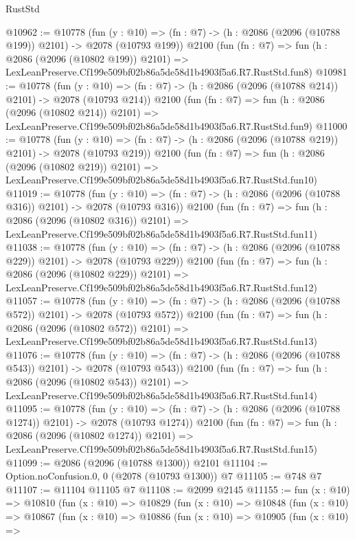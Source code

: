 \begin{lexlean}{RustStd}
\begin{coremodule}
@10962 := @10778
    (fun (y : @10) => (fn : @7) -> (h : @2086 (@2096 (@10788 @199)) @2101) -> @2078 (@10793 @199))
    @2100
    (fun (fn : @7) =>
    fun (h : @2086 (@2096 (@10802 @199)) @2101) =>
    LexLeanPreserve.Cf199e509bf02b86a5de58d1b4903f5a6.R7.RustStd.fun8)
@10981 := @10778
    (fun (y : @10) => (fn : @7) -> (h : @2086 (@2096 (@10788 @214)) @2101) -> @2078 (@10793 @214))
    @2100
    (fun (fn : @7) =>
    fun (h : @2086 (@2096 (@10802 @214)) @2101) =>
    LexLeanPreserve.Cf199e509bf02b86a5de58d1b4903f5a6.R7.RustStd.fun9)
@11000 := @10778
    (fun (y : @10) => (fn : @7) -> (h : @2086 (@2096 (@10788 @219)) @2101) -> @2078 (@10793 @219))
    @2100
    (fun (fn : @7) =>
    fun (h : @2086 (@2096 (@10802 @219)) @2101) =>
    LexLeanPreserve.Cf199e509bf02b86a5de58d1b4903f5a6.R7.RustStd.fun10)
@11019 := @10778
    (fun (y : @10) => (fn : @7) -> (h : @2086 (@2096 (@10788 @316)) @2101) -> @2078 (@10793 @316))
    @2100
    (fun (fn : @7) =>
    fun (h : @2086 (@2096 (@10802 @316)) @2101) =>
    LexLeanPreserve.Cf199e509bf02b86a5de58d1b4903f5a6.R7.RustStd.fun11)
@11038 := @10778
    (fun (y : @10) => (fn : @7) -> (h : @2086 (@2096 (@10788 @229)) @2101) -> @2078 (@10793 @229))
    @2100
    (fun (fn : @7) =>
    fun (h : @2086 (@2096 (@10802 @229)) @2101) =>
    LexLeanPreserve.Cf199e509bf02b86a5de58d1b4903f5a6.R7.RustStd.fun12)
@11057 := @10778
    (fun (y : @10) => (fn : @7) -> (h : @2086 (@2096 (@10788 @572)) @2101) -> @2078 (@10793 @572))
    @2100
    (fun (fn : @7) =>
    fun (h : @2086 (@2096 (@10802 @572)) @2101) =>
    LexLeanPreserve.Cf199e509bf02b86a5de58d1b4903f5a6.R7.RustStd.fun13)
@11076 := @10778
    (fun (y : @10) => (fn : @7) -> (h : @2086 (@2096 (@10788 @543)) @2101) -> @2078 (@10793 @543))
    @2100
    (fun (fn : @7) =>
    fun (h : @2086 (@2096 (@10802 @543)) @2101) =>
    LexLeanPreserve.Cf199e509bf02b86a5de58d1b4903f5a6.R7.RustStd.fun14)
@11095 := @10778
    (fun (y : @10) => (fn : @7) -> (h : @2086 (@2096 (@10788 @1274)) @2101) -> @2078 (@10793 @1274))
    @2100
    (fun (fn : @7) =>
    fun (h : @2086 (@2096 (@10802 @1274)) @2101) =>
    LexLeanPreserve.Cf199e509bf02b86a5de58d1b4903f5a6.R7.RustStd.fun15)
@11099 := @2086 (@2096 (@10788 @1300)) @2101
@11104 := Option.noConfusion.{0, 0} (@2078 (@10793 @1300)) @7
@11105 := @748 @7
@11107 := @11104 @11105 @7
@11108 := @2099 @2145
@11155 := fun (x : @10) =>
  @10810
    (fun (x : @10) =>
    @10829
      (fun (x : @10) =>
      @10848
        (fun (x : @10) =>
        @10867
          (fun (x : @10) =>
          @10886
            (fun (x : @10) =>
            @10905
              (fun (x : @10) =>

\end{coremodule}
\end{lexlean}
